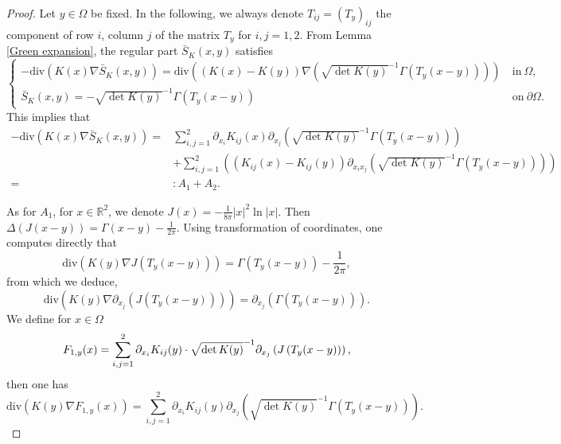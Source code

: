 \documentclass[12pt,reqno]{amsart}
\numberwithin{equation}{section}
\theoremstyle{definition}
\theoremstyle{remark}
\begin{document}
\begin{proof}
	Let  $ y\in\Omega $ be fixed. In the following,  we always denote $ T_{ij}=(T_y)_{ij} $ the component of row $ i $, column $ j $ of the matrix $ T_y $ for $ i,j=1,2 $. From Lemma \ref{Green expansion}, the regular part $ \bar{S}_K(x,y) $ satisfies
	\begin{equation}\label{equa of S_K}
	\begin{cases}
	-\text{div}\left (K(x)\nabla \bar{S}_K(x,y)\right )=\text{div}\left (\left (K(x)-K(y)\right )\nabla \left( \sqrt{\det K(y)}^{-1}\Gamma\left (T_y(x-y)\right )\right)  \right )\ &\text{in}\ \Omega,\\
	\bar{S}_K(x,y)=-\sqrt{\det K(y)}^{-1}\Gamma\left (T_y(x-y)\right )\ &\text{on}\ \partial\Omega.
	\end{cases}
	\end{equation}
	This implies that
	\begin{equation}\label{3-1}
	\begin{split}
	-\text{div}\left (K(x)\nabla \bar{S}_K(x,y)\right )=&\sum_{i,j=1}^2\partial_{x_i}K_{ij}(x)\partial_{x_j}\left(\sqrt{\det K(y)}^{-1}\Gamma\left (T_y(x-y)\right ) \right) \\
	&+\sum_{i,j=1}^2\left( \left( K_{ij}(x)-K_{ij}(y)\right) \partial_{x_ix_j}\left(\sqrt{\det K(y)}^{-1}\Gamma\left (T_y(x-y)\right ) \right)\right)\\
	=&:A_1+A_2.
	\end{split}
	\end{equation}
	
	As for $ A_1 $, for $ x\in\mathbb{R}^2 $, we denote $ J(x)=-\frac{1}{8\pi}|x|^2\ln|x| $. Then $ \Delta \left( J(x-y)\right)=\Gamma(x-y)-\frac{1}{2\pi}.  $
	Using transformation of coordinates, one computes directly that
	\begin{equation*}
	\text{div}\left(K(y)\nabla J(T_y(x-y)) \right)= \Gamma(T_y(x-y))-\frac{1}{2\pi},
	\end{equation*}
	from which we deduce,
	\begin{equation*}
	\text{div}\left(K(y)\nabla   \partial_{x_j}\left( J(T_y(x-y))\right)  \right)= \partial_{x_j} \left( \Gamma(T_y(x-y))\right) .
	\end{equation*}
	We define for $ x\in\Omega $
	\begin{equation}\label{F_{1,y}}
	\begin{split}
	F_{1,y}(x)=\sum_{i,j=1}^2\partial_{x_i}K_{ij}(y)\cdot\sqrt{\det K(y)}^{-1} \partial_{x_j}\left( J\left (T_y(x-y)\right )\right) ,
	\end{split}
	\end{equation}
	then one has
	\begin{equation}\label{3-2}
	\text{div}\left(K(y)\nabla F_{1,y}(x)  \right)= \sum_{i,j=1}^2\partial_{x_i}K_{ij}(y)\partial_{x_j}\left(\sqrt{\det K(y)}^{-1}\Gamma\left (T_y(x-y)\right ) \right).
	\end{equation}
	

\end{proof}
\end{document}
